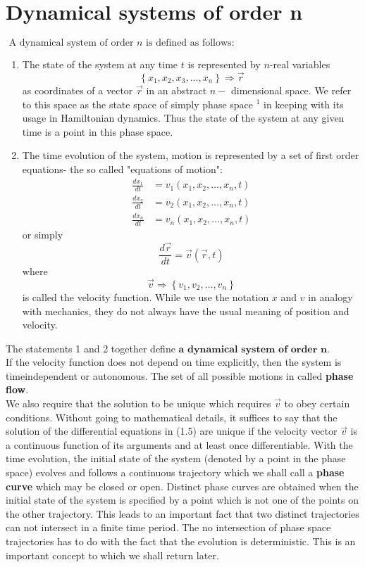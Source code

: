 \section{ Dynamical systems of order n}
$\text { A dynamical system of order } n \text { is defined as follows: }$
\begin{enumerate}
	\item The state of the system at any time $t$ is represented by $n$-real variables
	$$
	\left\{x_{1}, x_{2}, x_{3}, \ldots, x_{n}\right\} \Rightarrow \vec{r}
	$$
	as coordinates of a vector $\vec{r}$ in an abstract $n-$ dimensional space. We refer to this space as the state space of simply phase space ${ }^{1}$ in keeping with its usage in Hamiltonian dynamics. Thus the state of the system at any given time is a point in this phase space.
	\item The time evolution of the system, motion is represented by a set of first order equations- the so called "equations of motion":
	\begin{align}
	\frac{d x_{1}}{d t} &=v_{1}\left(x_{1}, x_{2}, \ldots, x_{n}, t\right) \\
	\frac{d x_{2}}{d t} &=v_{2}\left(x_{1}, x_{2}, \ldots, x_{n}, t\right) \\
	\frac{d x_{n}}{d t} &=v_{n}\left(x_{1}, x_{2}, \ldots, x_{n}, t\right)
	\end{align}
	or simply
	$$
	\frac{d \vec{r}}{d t}=\vec{v}(\vec{r}, t)
	$$
	where
	$$
	\vec{v} \Rightarrow\left\{v_{1}, v_{2}, \ldots, v_{n}\right\}
	$$
	is called the velocity function. While we use the notation $x$ and $v$ in analogy with mechanics, they do not always have the usual meaning of position and velocity.
\end{enumerate}
The statements 1 and 2 together define  $\textbf{a dynamical system of order n}$.\\
 If the velocity function does not depend on time explicitly, then the system is timeindependent or autonomous. The set of all possible motions in called \textbf{phase flow}.\\
We also require that the solution to be unique which requires $\vec{v}$ to obey certain conditions. Without going to mathematical details, it suffices to say that the solution of the differential equations in (1.5) are unique if the velocity vector $\vec{v}$ is a continuous function of its arguments and at least once differentiable. With the time evolution, the initial state of the system (denoted by a point in the phase space) evolves and follows a continuous trajectory which we shall call a \textbf{phase curve} which may be closed or open. Distinct phase curves are obtained when the initial state of the system is specified by a point which is not one of the points on the other trajectory. This leads to an important fact that two distinct trajectories can not intersect in a finite time period. The no intersection of phase space trajectories has to do with the fact that the evolution is deterministic. This is an important concept to which we shall return later.
